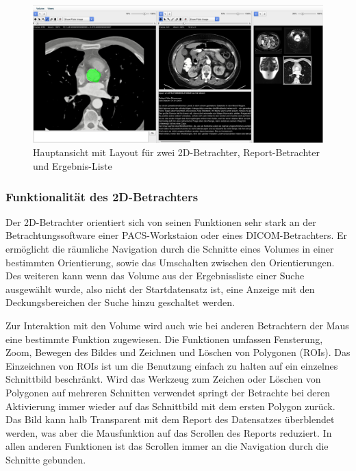 \begin{figure}[t]
	\centering
		\includegraphics[width=\linewidth]{img/c3_application_standard.jpg}
	\caption{Hauptansicht mit Layout für zwei 2D-Betrachter, Report-Betrachter und Ergebnis-Liste}
	\label{fig:omip_aplication_layout}
\end{figure}


\subsubsection{Funktionalität des 2D-Betrachters}
\label{sec:Funktionalität des 2D-Betrachters}
Der 2D-Betrachter orientiert sich von seinen Funktionen sehr stark an der Betrachtungssoftware einer PACS-Workstaion oder eines DICOM-Betrachters.
Er ermöglicht die räumliche Navigation durch die Schnitte eines Volumes in einer bestimmten Orientierung, sowie das Umschalten zwischen den Orientierungen.
Des weiteren kann wenn das Volume aus der Ergebnissliste einer Suche ausgewählt wurde, 
also nicht der Startdatensatz ist,
eine Anzeige mit den Deckungsbereichen der Suche hinzu geschaltet werden. 

Zur Interaktion mit den Volume wird auch wie bei anderen Betrachtern der Maus eine bestimmte Funktion zugewiesen.
Die Funktionen umfassen Fensterung, Zoom, Bewegen des Bildes und Zeichnen und Löschen von Polygonen (ROIs).
Das Einzeichnen von ROIs ist um die Benutzung einfach zu halten auf ein einzelnes Schnittbild beschränkt.
Wird das Werkzeug zum Zeichen oder Löschen von Polygonen auf mehreren Schnitten verwendet springt der Betrachte bei deren Aktivierung immer wieder auf das Schnittbild mit dem ersten Polygon zurück.
Das Bild kann halb Transparent mit dem Report des Datensatzes überblendet werden, was aber die Mausfunktion auf das Scrollen des Reports reduziert.
In allen anderen Funktionen ist das Scrollen immer an die Navigation durch die Schnitte gebunden.

